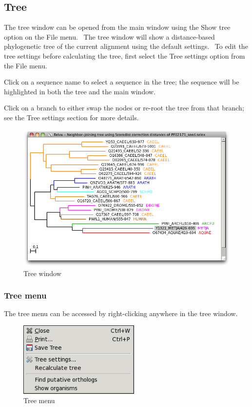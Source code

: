 \documentclass[letterpaper]{article}
\begin{document}
\subsection[Tree]{Tree}
The tree window can be opened from the main window using the {\textquotesingle}Show tree{\textquotesingle} option on the File menu. \ The tree window will show a distance-based phylogenetic tree of the current alignment using the default settings. \ To edit the tree settings before calculating the tree, first select the {\textquotesingle}Tree settings{\textquotesingle} option from the File menu.

Click on a sequence name to select a sequence in the tree; the sequence will be highlighted in both the tree and the main window.

Click on a branch to either swap the nodes or re-root the tree from that branch; see the Tree settings section for more details.

\begin{figure}[htb]
\centering
\color{lightblue}
\includegraphics[width=\textwidth]{img_window_tree.png}
\caption{Tree window}
\label{fig:tree_window}
\end{figure}


\subsubsection[Tree menu]{Tree menu}
The tree menu can be accessed by right-clicking anywhere in the tree window.

\begin{figure}[htb]
\centering
\color{lightblue}
\includegraphics[width=6cm]{img_menu_tree.png}
\caption{Tree menu}
\label{fig:tree_menu}
\end{figure}
\end{document}
